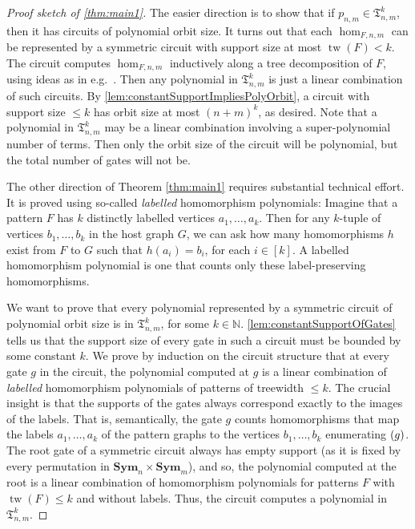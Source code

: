 \documentclass[11pt, DIV=15]{scrarticle}
\theoremstyle{definition}
\theoremstyle{plain}
\theoremstyle{remark}
\DeclareMathOperator{\tw}{tw}
\newcommand{\Sym}{\mathbf{Sym}}
\newcommand{\bbN}{\mathbb{N}}
\let\sup\relax
\DeclareMathOperator{\sup}{sup}
\begin{document}
\begin{proof}[Proof sketch of \cref{thm:main1}]
The easier direction is to show that if $p_{n,m} \in \mathfrak{T}_{n,m}^k$, then it has circuits of polynomial orbit size.
It turns out that each $\hom_{F, n, m}$ can be represented by a symmetric circuit with support size at most $\tw(F) < k$. 
The circuit computes $\hom_{F, n, m}$ inductively along a tree decomposition of $F$, using ideas as in e.g.\ \cite{dvorak_recognizing_2010}. 
Then any polynomial in $\mathfrak{T}_{n,m}^k$ is just a linear combination of such circuits.
By \cref{lem:constantSupportImpliesPolyOrbit}, a circuit with support size $\leq k$ has orbit size at most $(n+m)^k$, as desired. Note that a polynomial in $\mathfrak{T}_{n,m}^k$ may be a linear combination involving a super-polynomial number of terms. Then only the orbit size of the circuit will be polynomial, but the total number of gates will not be.

The other direction of Theorem \ref{thm:main1} requires substantial technical effort. It is proved using so-called \emph{labelled} homomorphism polynomials: Imagine that a pattern $F$ has $k$ distinctly labelled vertices $a_1, \dots, a_k$. Then for any $k$-tuple of vertices $b_1, \dots, b_k$ in the host graph $G$, we can ask how many homomorphisms $h$ exist from $F$ to $G$ such that $h(a_i) = b_i$, for each $i \in [k]$. A labelled homomorphism polynomial is one that counts only these label-preserving homomorphisms. 

We want to prove that every polynomial represented by a symmetric circuit of polynomial orbit size is in $\mathfrak{T}_{n,m}^k$, for some $k \in \bbN$.
\cref{lem:constantSupportOfGates} tells us that the support size of every gate in such a circuit must be bounded by some constant $k$. We prove by induction on the circuit structure that at every gate $g$ in the circuit, the polynomial computed at $g$ is a linear combination of \emph{labelled} homomorphism polynomials of patterns of treewidth $\leq k$.
The crucial insight is that the supports of the gates always correspond exactly to the images of the labels. That is, semantically, the gate $g$ counts homomorphisms that map the labels $a_1, \dots, a_k$ of the pattern graphs to the vertices
$b_1, \dots, b_k$ enumerating $\sup(g)$.
The root gate of a symmetric circuit always has empty support (as it is fixed by every permutation in $\Sym_n \times \Sym_m$), and so, the polynomial computed at the root is a linear combination of homomorphism polynomials for patterns $F$ with $\tw(F) \leq k$ and without labels. Thus, the circuit computes a polynomial in $\mathfrak{T}_{n,m}^k$.
\end{proof}
\end{document}
